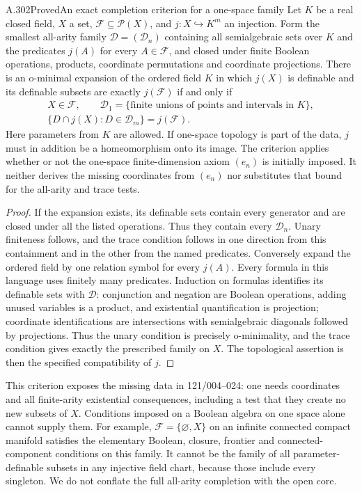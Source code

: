 \begin{saresult}{A.302}{Proved}{An exact completion criterion for a one-space family}
Let $K$ be a real closed field, $X$ a set, $\mathcal F\subseteq\mathcal P(X)$,
and $j:X\hookrightarrow K^m$ an injection. Form the smallest all-arity
family $\mathcal D=(\mathcal D_n)$ containing all semialgebraic sets over
$K$ and the predicates $j(A)$ for every $A\in\mathcal F$, and closed under
finite Boolean operations, products, coordinate permutations and coordinate
projections. There is an o-minimal expansion of the ordered field $K$ in
which $j(X)$ is definable and its definable subsets are exactly $j(\mathcal F)$
if and only if
\[
\begin{gathered}
 X\in\mathcal F,\qquad
 \mathcal D_1=\{\text{finite unions of points and intervals in }K\},
 \\
 \{D\cap j(X):D\in\mathcal D_m\}=j(\mathcal F).
\end{gathered}
\]
Here parameters from $K$ are allowed. If one-space topology is part of
the data, $j$ must in addition be a homeomorphism onto its image.
The criterion applies whether or not the one-space finite-dimension
axiom $(e_n)$ is initially imposed. It neither derives the missing
coordinates from $(e_n)$ nor substitutes that bound for the all-arity
and trace tests.
\end{saresult}
\begin{proof}
If the expansion exists, its definable sets contain every generator and
are closed under all the listed operations. Thus they contain every
$\mathcal D_n$. Unary finiteness follows, and the trace condition follows
in one direction from this containment and in the other from the named
predicates. Conversely expand the ordered field by one relation symbol
for every $j(A)$. Every formula in this language uses finitely many
predicates. Induction on formulas identifies its definable sets with
$\mathcal D$: conjunction and negation are Boolean operations, adding
unused variables is a product, and existential quantification is
projection; coordinate identifications are intersections with
semialgebraic diagonals followed by projections. Thus the unary condition
is precisely o-minimality, and the trace condition gives exactly the
prescribed family on $X$. The topological assertion is then the specified
compatibility of $j$.
\end{proof}

This criterion exposes the missing data in 121/004--024: one needs
coordinates and all finite-arity existential consequences, including a
test that they create no new subsets of $X$. Conditions imposed on a
Boolean algebra on one space alone cannot supply them. For example,
$\mathcal F=\{\varnothing,X\}$ on an infinite connected compact manifold
satisfies the elementary Boolean, closure, frontier and connected-component
conditions on this family. It cannot be the family of all parameter-definable
subsets in any injective field chart, because those include every singleton.
We do not conflate the full all-arity completion with the open core.

